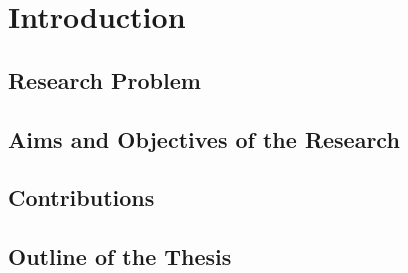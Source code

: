 \chapter{Introduction}\label{ch:introduction}

\section{Research Problem}\label{sec:research_problem}

\section{Aims and Objectives of the Research}\label{sec:research_approach}

\section{Contributions}\label{sec:contributions}

\section{Outline of the Thesis}\label{sec:thesis_outline}